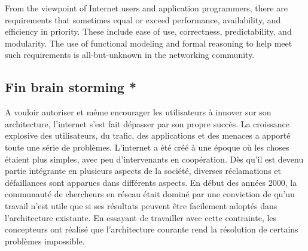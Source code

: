 From the viewpoint of Internet users and application programmers, there are requirements that sometimes equal or exceed performance, availability, and efficiency in priority. These include ease of use, correctness, predictability, and modularity. The use of functional modeling and formal reasoning to help meet such requirements is all-but-unknown in the networking community.


\subsection*{Fin brain storming *}
A vouloir autoriser et même encourager les utilisateurs à innover sur son architecture, l'internet s'est fait dépasser par son propre succès. La croissance explosive des utilisateurs, du trafic, des applications et des menaces a apporté toute une série de problèmes. L'internet a été créé à une époque où les choses étaient plus simples, avec peu d'intervenants en coopération. Dès qu'il est devenu partie intégrante en plusieurs aspects de la société, diverses réclamations et défaillances sont apparues dans différents aspects. En début des années 2000, la communauté de chercheurs en réseau était dominé par une conviction de qu'un travail n'est utile que si ses résultats peuvent être facilement adoptés dans l'architecture existante. En essayant de travailler avec cette contrainte, les concepteurs ont réalisé que l'architecture courante rend la résolution de certains problèmes impossible. \cite{InternetEvolutionRoleSoftwareEngineering}






